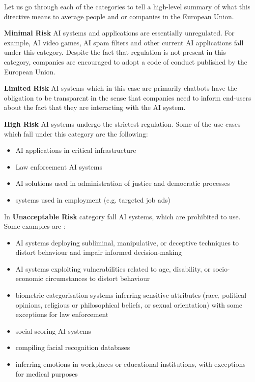 Let us go through each of the categories to tell a high-level summary of what this directive means to average people and or companies in the European Union.

\textbf{Minimal Risk} AI systems and applications are essentially unregulated. For example, AI video games, AI spam filters and other current AI applications fall under this category. Despite the fact that regulation is not present in this category, companies are encouraged to adopt a code of conduct published by the European Union.

\textbf{Limited Risk} AI systems which in this case are primarily chatbots have the obligation to be transparent in the sense that companies need to inform end-users about the fact that they are interacting with the AI system.

\textbf{High Risk} AI systems undergo the strictest regulation. Some of the use cases which fall under this category are the following\cite{eu_ai_act_summary}:
\begin{itemize}
    \item AI applications in critical infrastructure
    \item Law enforcement AI systems
    \item AI solutions used in administration of justice and democratic processes
    \item systems used in employment (e.g. targeted job ads)
\end{itemize}

In \textbf{Unacceptable Risk} category fall AI systems, which are prohibited to use. Some examples are \cite{eu_ai_act_summary}:
\begin{itemize}
    \item AI systems deploying subliminal, manipulative, or deceptive techniques to distort behaviour and impair informed decision-making
    \item AI systems exploiting vulnerabilities related to age, disability, or socio-economic circumstances to distort behaviour
    \item biometric categorisation systems inferring sensitive attributes (race, political opinions, religious or philosophical beliefs, or sexual orientation) with some exceptions for law enforcement
    \item social scoring AI systems
    \item compiling facial recognition databases
    \item inferring emotions in workplaces or educational institutions, with exceptions for medical purposes
\end{itemize}


